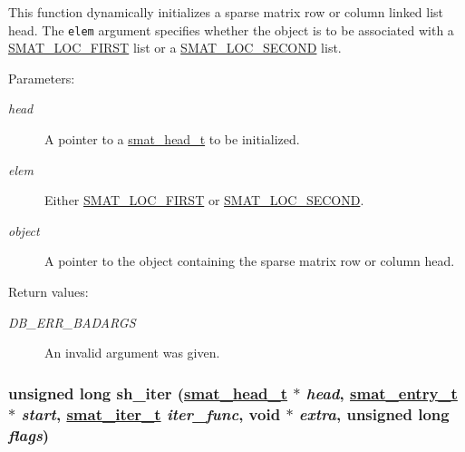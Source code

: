 This function dynamically initializes a sparse matrix row or column linked list head. The {\tt elem} argument specifies whether the object is to be associated with a \hyperlink{group__dbprim__smat_a48a136}{SMAT\_\-LOC\_\-FIRST} list or a \hyperlink{group__dbprim__smat_a48a137}{SMAT\_\-LOC\_\-SECOND} list.\begin{Desc}
\item[Parameters: ]\par
\begin{description}
\item[{\em 
head}]A pointer to a \hyperlink{group__dbprim__smat_a1}{smat\_\-head\_\-t} to be initialized. \item[{\em 
elem}]Either \hyperlink{group__dbprim__smat_a48a136}{SMAT\_\-LOC\_\-FIRST} or \hyperlink{group__dbprim__smat_a48a137}{SMAT\_\-LOC\_\-SECOND}. \item[{\em 
object}]A pointer to the object containing the sparse matrix row or column head.\end{description}
\end{Desc}
\begin{Desc}
\item[Return values: ]\par
\begin{description}
\item[{\em 
DB\_\-ERR\_\-BADARGS}]An invalid argument was given. \end{description}
\end{Desc}
\hypertarget{group__dbprim__smat_a20}{
\subsubsection[sh\_\-iter]{\setlength{\rightskip}{0pt plus 5cm}unsigned long sh\_\-iter (\hyperlink{group__dbprim__smat_a1}{smat\_\-head\_\-t} $\ast$ {\em head}, \hyperlink{group__dbprim__smat_a2}{smat\_\-entry\_\-t} $\ast$ {\em start}, \hyperlink{group__dbprim__smat_a4}{smat\_\-iter\_\-t} {\em iter\_\-func}, void $\ast$ {\em extra}, unsigned long {\em flags})}}
\label{group__dbprim__smat_a20}



